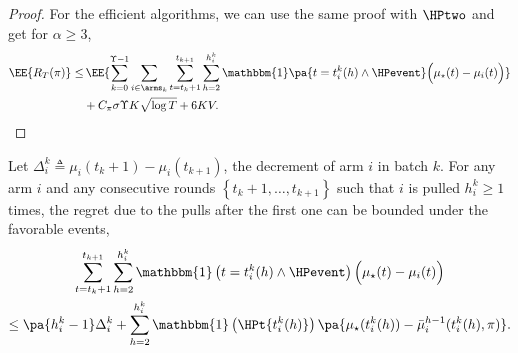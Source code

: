 \begin{proof}
For the efficient algorithms, we can use the same proof with $\HPtwo$ and get for $\alpha \geq 3$, 
\begin{align*}
\EE{R_T(\pi)} \leq &  \, \EE{\sum_{k=0}^{\Upsilon-1} \sum_{i\in\arms_k}\sum_{t=t_k +1 }^{t_{k+1}}\sum_{h=2}^{h^k_{i}}\mathbbm{1}\pa{ t = t_i^k(h) \land \HPevent} \Big(  \mu_{\star}(t) - \mu_{i}(t)\Big)} \\
&+  C_\pi \sigma \Upsilon K \sqrt{\log{T}} + 6KV.
\end{align*}

\end{proof}

\begin{lemma}\label{lem:OP}
Let $\Delta_i^k \triangleq \mu_i(t_k+1) - \mu_i(t_{k+1})$, the decrement of arm $i$ in batch $k$. For any arm $i$ and any consecutive rounds $\left\{t_k+1, \dots , t_{k+1}\right\}$ such that $i$ is pulled $h_i^{k} \geq 1$ times, the regret due to the pulls after the first one can be bounded under the favorable events, 
\begin{multline*}
\sum_{t=t_{k} +1 }^{t_{k+1}} \sum_{h=2}^{h^k_{i}}\mathbbm{1}\left(t = t_i^k(h) \land \HPevent \right)\Big(  \mu_{\star}(t) - \mu_{i}(t)\Big) \\ \leq  \pa{h_i^k-1}\Delta_i^k + \sum_{h=2}^{h^k_{i}}\mathbbm{1}\left(\HPt{t_i^k(h)}\right)\pa{  \mu_{\star}(t_i^k(h)) - \bar{\mu}_i^{h-1}(t_i^k(h),\pi)} .
\end{multline*}
\end{lemma}
